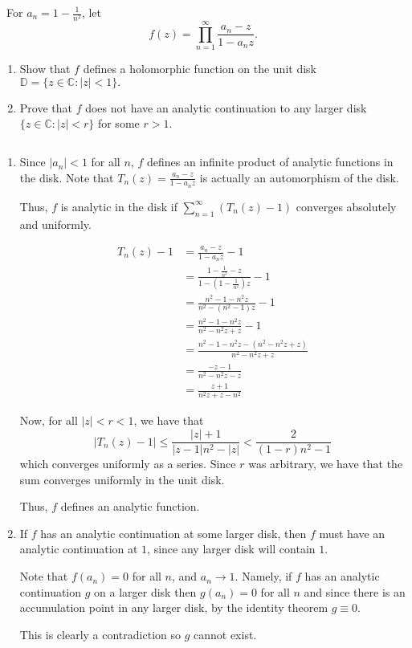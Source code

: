 \documentclass[12pt]{Homework}
\begin{document}
\begin{problem} $\,$
For $a_n=1-\frac{1}{n^2}$, let $$f(z)=\prod_{n=1}^\infty\frac{a_n-z}{1-a_nz}.$$
\begin{enumerate}[label=(\alph*)]
    \item Show that $f$ defines a holomorphic function on the unit disk $\mathbb{D}=\{z\in\mathbb{C}:|z|<1\}.$
    \item Prove that $f$ does not have an analytic continuation to any larger disk $\{z\in\mathbb{C}:|z|<r\}$ for some $r>1$.
\end{enumerate}
\end{problem}


\begin{solution}$\,$
\begin{enumerate}[label=(\alph*)]
    \item Since $|a_n|<1$ for all $n$, $f$ defines an infinite product of analytic functions in the disk. Note that $T_n(z)=\frac{a_n-z}{1-a_nz}$ is actually an automorphism of the disk.
    
    Thus, $f$ is analytic in the disk if $\sum_{n=1}^\infty(T_n(z)-1)$ converges absolutely and uniformly. 
    
    \begin{align*}
        T_n(z)-1&=\frac{a_n-z}{1-a_nz}-1\\
        &=\frac{1-\frac{1}{n^2}-z}{1-(1-\frac{1}{n^2})z}-1\\
        &=\frac{n^2-1-n^2z}{n^2-(n^2-1)z}-1\\
        &=\frac{n^2-1-n^2z}{n^2-n^2z+z}-1\\
        &=\frac{n^2-1-n^2z-(n^2-n^2z+z)}{n^2-n^2z+z}\\
        &=\frac{-z-1}{n^2-n^2z-z}\\
        &=\frac{z+1}{n^2z+z-n^2}
    \end{align*}
    
    Now, for all $|z|<r<1$, we have that $$|T_n(z)-1|\le \frac{|z|+1}{|z-1|n^2-|z|}<\frac{2}{(1-r)n^2-1}$$ which converges uniformly as a series. Since $r$ was arbitrary, we have that the sum converges uniformly in the unit disk.
    
    Thus, $f$ defines an analytic function.
    \item If $f$ has an analytic continuation at some larger disk, then $f$ must have an analytic continuation at $1$, since any larger disk will contain $1$.
    
    Note that $f(a_n)=0$ for all $n$, and $a_n\to 1$. Namely, if $f$ has an analytic continuation $g$ on a larger disk then $g(a_n)=0$ for all $n$ and since there is an accumulation point in any larger disk, by the identity theorem $g\equiv 0$. 
    
    This is clearly a contradiction so $g$ cannot exist.
\end{enumerate}
\end{solution}
\end{document}
